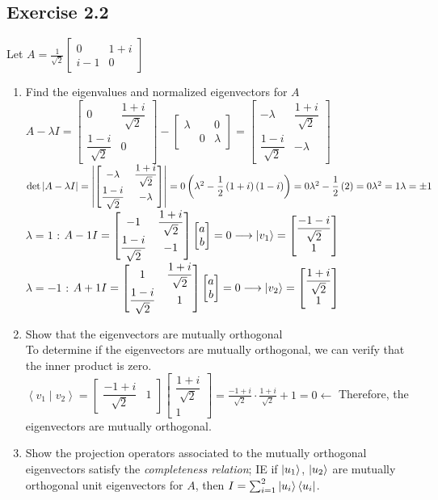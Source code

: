\documentclass[12pt]{article}
\theoremstyle{plain}
\theoremstyle{nonumberplain}
\theoremstyle{plain}
\theoremstyle{nonumberplain}
\newcommand\1{{\bf 1}}
\newcommand{\bmat}[1]{\begin{bmatrix*} #1 \end{bmatrix*}} %
\newcommand{\<}{\left\langle}
\renewcommand{\>}{\right\rangle}
\newcommand{\inp}[2]{\left\langle#1\mid #2\right\rangle} %
\begin{document}
\subsection{Exercise 2.2}
Let $A=\frac{1}{\sqrt{2}}\bmat{0 & 1+i \\ i-1 & 0}$
\begin{enumerate}[label=(\alph*)]
\item Find the eigenvalues and normalized eigenvectors for $A$ \\
$A-\lambda I=\begin{bmatrix}
0 & \dfrac{1+i}{\sqrt{2}} \\
\dfrac{1-i}{\sqrt{2}} & 0
\end{bmatrix}-\begin{bmatrix}
\lambda  &  & 0 \\
 & 0 & \lambda 
\end{bmatrix}=\begin{bmatrix}
-\lambda  & \dfrac{1+i}{\sqrt{2}} \\
\dfrac{1-i}{\sqrt{2}} & -\lambda 
\end{bmatrix}$\\$\det \left| A-\lambda I\right| =\left| \begin{bmatrix}
-\lambda  & \dfrac{1+i}{\sqrt{2}} \\
\dfrac{1-i}{\sqrt{2}} & -\lambda 
\end{bmatrix}\right| =0\\
\left( \lambda ^{2}-\dfrac{1}{2}\left( 1+i\right) \left( 1-i\right) \right) =0\\
\lambda ^{2}-\dfrac{1}{2}\left( 2\right) =0\\
\lambda ^{2}=1\\
\lambda =\pm 1$ \\
$\lambda=1$ : $A-1I=\bmat{-1 & \dfrac{1+i}{\sqrt{2}} \\ \dfrac{1-i}{\sqrt{2}} & -1}\bmat{a \\ b}=0\longrightarrow\ket{v_1}=\bmat{\dfrac{-1-i}{\sqrt{2}} \\ 1}$ \\
$\lambda=-1$ : $A+1I=\bmat{1 & \dfrac{1+i}{\sqrt{2}} \\ \dfrac{1-i}{\sqrt{2}} & 1}\bmat{a \\ b}=0\longrightarrow\ket{v_2}=\bmat{\dfrac{1+i}{\sqrt{2}} \\ 1}$

\item Show that the eigenvectors are mutually orthogonal \\
To determine if the eigenvectors are mutually orthogonal, we can verify that the inner product is zero. \\
$\inp{v_1}{v_2}=\bmat{\dfrac{-1+i}{\sqrt{2}} & 1}\bmat{\dfrac{1+i}{\sqrt{2}} \\ 1}=\frac{-1+i}{\sqrt{2}}\cdot\frac{1+i}{\sqrt{2}}+1=0\longleftarrow$ Therefore, the eigenvectors are mutually orthogonal.
\item Show the projection operators associated to the mutually orthogonal eigenvectors satisfy the \textit{completeness relation}; IE if $\ket{u_1}$, $\ket{u_2}$ are mutually orthogonal unit eigenvectors for $A$, then $I=\sum^2_{i=1}\ket{u_i}\bra{u_i}$. \\


\end{enumerate}
\end{document}
